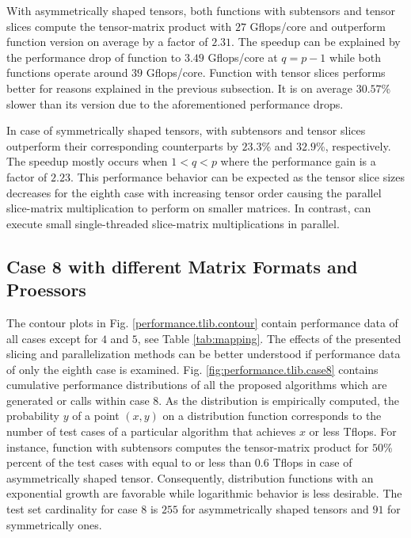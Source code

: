 With asymmetrically shaped tensors, both  functions with subtensors and tensor slices compute the tensor-matrix product with $27$ Gflops/core and outperform function \allowbreak{} version on average by a factor of $2.31$.
The speedup can be explained by the performance drop of function \allowbreak{} to $3.49$ Gflops/core at $q=p-1$ while both  functions operate around $39$ Gflops/core.
Function  with tensor slices performs better for reasons explained in the previous subsection.
It is on average $30.57$\% slower than its  version due to the aforementioned performance drops.

In case of symmetrically shaped tensors,  with subtensors and tensor slices outperform their corresponding  counterparts by $23.3$\% and $32.9$\%, respectively.
The speedup mostly occurs when $1<q<p$ where the performance gain is a factor of $2.23$.
This performance behavior can be expected as the tensor slice sizes decreases for the eighth case with increasing tensor order causing the parallel slice-matrix multiplication to perform on smaller matrices.
In contrast,  can execute small single-threaded slice-matrix multiplications in parallel.





\subsection{Case 8 with different Matrix Formats and Proessors}
The contour plots in Fig. \ref{performance.tlib.contour} contain performance data of all cases except for $4$ and $5$, see Table \ref{tab:mapping}.
The effects of the presented slicing and parallelization methods can be better understood if performance data of only the eighth case is examined.
Fig. \ref{fig:performance.tlib.case8} contains cumulative performance distributions of all the proposed algorithms which are generated  or  calls within case 8.
As the distribution is empirically computed, the probability $y$ of a point $(x,y)$ on a distribution function corresponds to the number of test cases of a particular algorithm that achieves $x$ or less Tflops.
For instance, function  with subtensors computes the tensor-matrix product for $50$\% percent of the test cases with equal to or less than 0.6 Tflops in case of asymmetrically shaped tensor.
Consequently, distribution functions with an exponential growth are favorable while logarithmic behavior is less desirable.
The test set cardinality for case 8 is $255$ for asymmetrically shaped tensors and $91$ for symmetrically ones.

